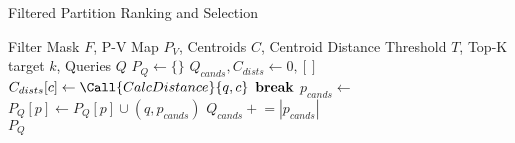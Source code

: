 \renewcommand{\algorithmicrequire}{\textbf{Input:}}

\begin{algorithm}[h]
\begin{algorithmic}[1]

\caption{Filtered Partition Ranking and Selection}
\label{alg:squash-cluster-ranking}

\Require Filter Mask $F$, P-V Map $P_V$, Centroids $C$, Centroid Distance Threshold $T$, Top-K target $k$, Queries $Q$
\State $P_{Q} \gets \{\}$
    \State $Q_{cands}, C_{dists} \gets 0, []$ %
     
        \State $C_{dists}[c] \gets \Call{CalcDistance}{q, c}$
    \EndFor
            \State ${\bf break}$
        \EndIf 
        \State $p_{cands} \gets $  %
            \State $P_{Q}[p] \gets P_{Q}[p] \cup (q, p_{cands})$ %
            \State $Q_{cands} \mathrel{+}= |p_{cands}|$
        \EndIf
    \EndFor
\EndFor\\
\Return $P_{Q}$ 

\end{algorithmic}
\end{algorithm}
